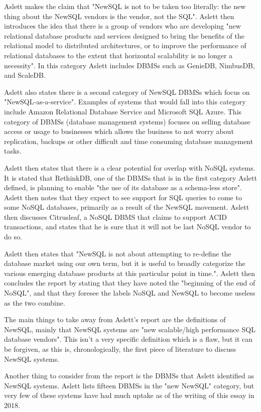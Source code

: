 \documentclass[10pt, conference]{IEEEtran}
\begin{document}
Aslett makes the claim that "NewSQL is not to be taken too literally: the new thing about the NewSQL vendors is the vendor, not the SQL". Aslett then introduces the idea that there is a group of vendors who are developing "new relational database products and services designed to bring the benefits of the relational model to distributed architectures, or to improve the performance of relational databases to the extent that horizontal scalability is no longer a necessity". In this category Aslett includes DBMSs such as GenieDB, NimbusDB, and ScaleDB.

Aslett also states there is a second category of NewSQL DBMSs which focus on "NewSQL-as-a-service". Examples of systems that would fall into this category include Amazon Relational Database Service and Microsoft SQL Azure. This category of DBMSs (database management systems) focuses on selling database access or usage to businesses which allows the business to not worry about replication, backups or other difficult and time consuming database management tasks.

Aslett then states that there is a clear potential for overlap with NoSQL systems. It is stated that RethinkDB, one of the DBMSs that is in the first category Aslett defined, is planning to enable "the use of its database as a schema-less store". Aslett then notes that they expect to see support for SQL queries to come to some NoSQL databases, primarily as a result of the NewSQL movement. Aslett then discusses Citrusleaf, a NoSQL DBMS that claims to support ACID transactions, and states that he is sure that it will not be last NoSQL vendor to do so.

Aslett then states that "NewSQL is not about attempting to re-define the database market using our own term, but it is useful to broadly categorize the various emerging database products at this particular point in time.". Aslett then concludes the report by stating that they have noted the "beginning of the end of NoSQL", and that they foresee the labels NoSQL and NewSQL to become useless as the two combine.

The main things to take away from Aslett's report are the definitions of NewSQL, mainly that NewSQL systems are "new scalable/high performance SQL database vendors". This isn't a very specific definition which is a flaw, but it can be forgiven, as this is, chronologically, the first piece of literature to discuss NewSQL systems.

Another thing to consider from the report is the DBMSs that Aslett identified as NewSQL systems. Aslett lists fifteen DBMSs in the "new NewSQL" category, but very few of these systems have had much uptake as of the writing of this essay in 2018.
\end{document}
